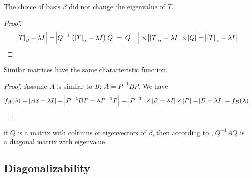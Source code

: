 \begin{theorem}
    The choice of basis $\beta$ did not change the eigenvalue of $T$. 
\end{theorem}
\begin{proof}
    \begin{equation*}
        \absolutevalue{\coordinate{T}_\beta - \lambda I} = \absolutevalue{Q^{-1} \left( \coordinate{T}_\alpha - \lambda I \right) Q} = \absolutevalue{Q^{-1}} \times \absolutevalue{\coordinate{T}_\alpha - \lambda I } \times \absolutevalue{Q} = \absolutevalue{\coordinate{T}_\alpha - \lambda I } 
    \end{equation*}
\end{proof}

\begin{theorem}
Similar matrices have the same characteristic function.    
\end{theorem}
\begin{proof}
    Assume $A$ is similar to $B$: $A = P^{-1} B P$. We have
    \begin{equation*}
    f_A(\lambda) = \abs{Ax - \lambda I} = \abs{P^{-1} B P - \lambda P^{-1} P} = \abs{P^{-1}} \times \abs{B - \lambda I } \times \abs{P} = \abs{B - \lambda I } = f_B(\lambda)
    \end{equation*}
\end{proof}




\begin{theorem}
    if $Q$ is a matrix with columns of eigenvectors of $\beta$, then according to  , $Q^{-1} A Q$ is a diagonal matrix with eigenvalue.
\end{theorem}



\subsection{Diagonalizability}


